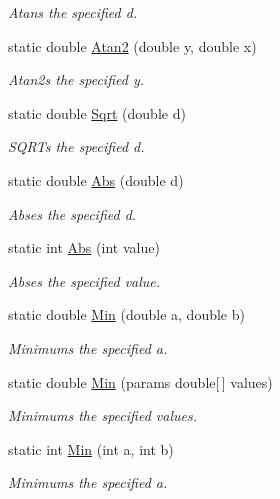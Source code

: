 \begin{DoxyCompactItemize}
\begin{DoxyCompactList}\small\item\em Atans the specified d. \end{DoxyCompactList}\item 
static double \hyperlink{struct_unity_engine_1_1_mathd_a3e5351b317964df9b7f46335da6b1035}{Atan2} (double y, double x)
\begin{DoxyCompactList}\small\item\em Atan2s the specified y. \end{DoxyCompactList}\item 
static double \hyperlink{struct_unity_engine_1_1_mathd_a547c7c6cacb3230ea2779007996db39b}{Sqrt} (double d)
\begin{DoxyCompactList}\small\item\em S\+Q\+R\+Ts the specified d. \end{DoxyCompactList}\item 
static double \hyperlink{struct_unity_engine_1_1_mathd_a64a85be6bf373ab9e9213992577465c7}{Abs} (double d)
\begin{DoxyCompactList}\small\item\em Abses the specified d. \end{DoxyCompactList}\item 
static int \hyperlink{struct_unity_engine_1_1_mathd_a0026ca0e9eb2b52802dbd16c682c2e1c}{Abs} (int value)
\begin{DoxyCompactList}\small\item\em Abses the specified value. \end{DoxyCompactList}\item 
static double \hyperlink{struct_unity_engine_1_1_mathd_afb195e2527d9c0ebe067f1cbd832ba38}{Min} (double a, double b)
\begin{DoxyCompactList}\small\item\em Minimums the specified a. \end{DoxyCompactList}\item 
static double \hyperlink{struct_unity_engine_1_1_mathd_a41a4668b0ccddc8afe70518098cb0c10}{Min} (params double\mbox{[}$\,$\mbox{]} values)
\begin{DoxyCompactList}\small\item\em Minimums the specified values. \end{DoxyCompactList}\item 
static int \hyperlink{struct_unity_engine_1_1_mathd_ac366d9fa5c7afe37c96e6933cdbd90ed}{Min} (int a, int b)
\begin{DoxyCompactList}\small\item\em Minimums the specified a. \end{DoxyCompactList}\item 

\end{DoxyCompactItemize}
